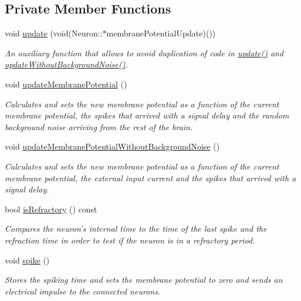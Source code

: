 \subsection*{Private Member Functions}
\begin{DoxyCompactItemize}
\item 
void \hyperlink{classNeuron_a521a967d65a078140cc9c6b8d30240ce}{update} (void(Neuron\-::$\ast$membrane\-Potential\-Update)())
\begin{DoxyCompactList}\small\item\em An auxiliary function that allows to avoid duplication of code in \hyperlink{classNeuron_a782b3b728eee5097ab205a7a7990225b}{update()} and \hyperlink{classNeuron_ababbaa5bc5f7b2e00e0ae5ffcc8fbfdb}{update\-Without\-Background\-Noise()}. \end{DoxyCompactList}\item 
void \hyperlink{classNeuron_a41a81d8527734e59bae39f73fece887f}{update\-Membrane\-Potential} ()
\begin{DoxyCompactList}\small\item\em Calculates and sets the new membrane potential as a function of the current membrane potential, the spikes that arrived with a signal delay and the random background noise arriving from the rest of the brain. \end{DoxyCompactList}\item 
void \hyperlink{classNeuron_a2a3d0130b76a6e1daa0191b97718178b}{update\-Membrane\-Potential\-Without\-Background\-Noise} ()
\begin{DoxyCompactList}\small\item\em Calculates and sets the new membrane potential as a function of the current membrane potential, the external input current and the spikes that arrived with a signal delay. \end{DoxyCompactList}\item 
bool \hyperlink{classNeuron_aa40fbb2b025efb1db420da32e16741c1}{is\-Refractory} () const 
\begin{DoxyCompactList}\small\item\em Compares the neuron's internal time to the time of the last spike and the refraction time in order to test if the neuron is in a refractory period. \end{DoxyCompactList}\item 
void \hyperlink{classNeuron_a955ecfd2984f75c18664bd370c34af1d}{spike} ()
\begin{DoxyCompactList}\small\item\em Stores the spiking time and sets the membrane potential to zero and sends an electrical impulse to the connected neurons. \end{DoxyCompactList}\item 

\end{DoxyCompactItemize}
